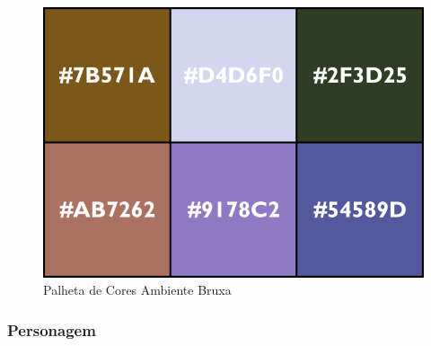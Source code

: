 \begin{figure}[htb]
	\caption{\label{fig_paletaKilin}Palheta de Cores Ambiente Bruxa}
	\begin{center}
	    \includegraphics[width=\textwidth/2]{imagens/PaletaKilin.png}
	\end{center}
\end{figure}

\subsubsection{Personagem}


